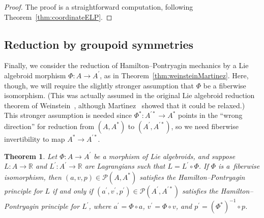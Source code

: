 \documentclass[pdftex]{sigma}
\numberwithin{equation}{section}
\newtheorem{Theorem}{Theorem}[section]
\begin{document}
\begin{proof} The proof is a straightforward computation, following Theorem~\ref{thm:coordinateELP}.
\end{proof}

\subsection{Reduction by groupoid symmetries}\label{sec:hpReduction}

Finally, we consider the reduction of Hamilton--Pontryagin mechanics by a Lie algebroid morphism $ \Phi \colon A \rightarrow A ^\prime $, as in Theorem~\ref{thm:weinsteinMartinez}. Here, though, we will require the slightly stronger assumption that $ \Phi $ be a f\/iberwise isomorphism. (This was actually assumed in the original Lie algebroid reduction theorem of Weinstein~\cite{Weinstein1996}, although Mart\'{\i}nez~\cite{Martinez2008} showed that it could be relaxed.) This stronger assumption is needed since $ \Phi ^\ast \colon A ^{ \prime \ast } \rightarrow A ^\ast $ points in the ``wrong direction'' for reduction from $ ( A, A ^\ast ) $ to $ ( A ^\prime , A ^{ \prime \ast } ) $, so we need f\/iberwise invertibility to map $ A ^\ast \rightarrow A ^{ \prime \ast }$.

\begin{Theorem} \label{thm:hpMorphismReduction}Let $ \Phi \colon A \rightarrow A ^\prime $ be a morphism of Lie algebroids, and suppose $ L \colon A \rightarrow \mathbb{R} $ and $ L ^\prime \colon A ^\prime \rightarrow \mathbb{R} $ are Lagrangians such that $ L = L ^\prime \circ \Phi $. If $ \Phi $ is a~fiberwise isomorphism, then $ ( a, v , p ) \in \mathcal{P} ( A , A ^\ast ) $ satisfies the Hamilton--Pontryagin principle for $L$ if and only if $ ( a ^\prime , v ^\prime , p ^\prime ) \in \mathcal{P} ( A ^\prime , A ^{\prime \ast} ) $ satisfies the Hamilton--Pontryagin principle for $L ^\prime $, where $ a ^\prime = \Phi \circ a $, $ v ^\prime = \Phi \circ v $, and $ p ^\prime = (\Phi ^\ast) ^{-1} \circ p $.
\end{Theorem}
\end{document}

